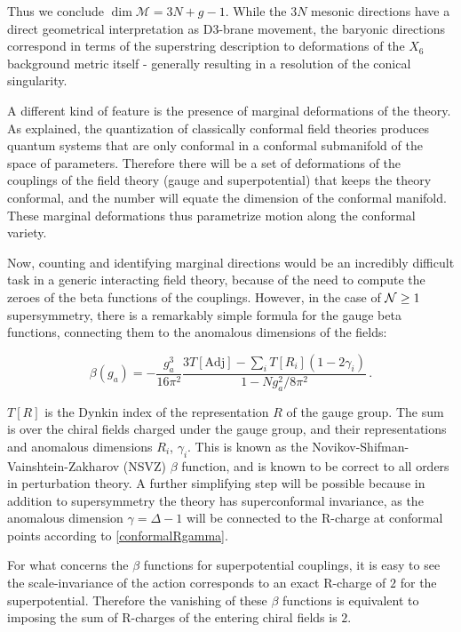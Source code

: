 Thus we conclude $\dim \mathcal M = 3N + g - 1$. While the $3N$ mesonic directions have a direct geometrical interpretation as D3-brane movement, the baryonic directions correspond in terms of the superstring description to deformations of the $X_6$ background metric itself - generally resulting in a resolution of the conical singularity.%

A different kind of feature is the presence of marginal deformations of the theory. As explained, the quantization of classically conformal field theories produces quantum systems that are only conformal in a conformal submanifold of the space of parameters. Therefore there will be a set of deformations of the couplings of the field theory (gauge and superpotential) that keeps the theory conformal, and the number will equate the dimension of the conformal manifold. These marginal deformations thus parametrize motion along the conformal variety. 

Now, counting and identifying marginal directions would be an incredibly difficult task in a generic interacting field theory, because of the need to compute the zeroes of the beta functions of the couplings. However, in the case of $\mathcal{N} \geq 1$ supersymmetry, there is a remarkably simple formula for the gauge beta functions, connecting them to the anomalous dimensions of the fields:

\begin{equation}
	\beta(g_a) = - \frac{g_a^3}{16\pi^2} \frac{3 T[\mathrm{Adj}] - \sum_i T[R_i] (1- 2\gamma_i) }{1-Ng_a^2 / 8\pi^2 }\,.
	\label{nszv}
\end{equation}

$T[R]$ is the Dynkin index of the representation $R$ of the gauge group. The sum is over the chiral fields charged under the gauge group, and their representations and anomalous dimensions $R_i$, $\gamma_i$. This is known as the Novikov-Shifman-Vainshtein-Zakharov (NSVZ) $\beta$ function, and is known to be correct to all orders in perturbation theory\cite{Carlino:1999tc}. A further simplifying step will be possible because in addition to supersymmetry the theory has superconformal invariance, as the anomalous dimension $\gamma = \Delta - 1$ will be connected to the R-charge at conformal points according to \eqref{conformalRgamma}.

For what concerns the $\beta$ functions for superpotential couplings, it is easy to see the scale-invariance of the action corresponds to an exact R-charge of $2$ for the superpotential. Therefore the vanishing of these $\beta$ functions is equivalent to imposing the sum of R-charges of the entering chiral fields is $2$.

